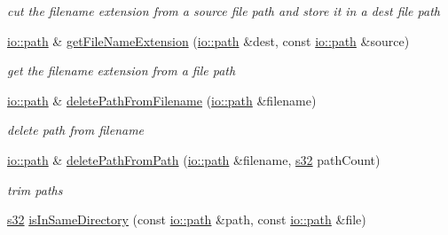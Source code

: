 \begin{DoxyCompactItemize}
\begin{DoxyCompactList}\small\item\em cut the filename extension from a source file path and store it in a dest file path \end{DoxyCompactList}\item 
\mbox{\label{namespaceirr_1_1core_abebbe8b229dc865ebeb9bb0fd367d6ea}} 
\hyperlink{namespaceirr_1_1io_ab1bdc45edb3f94d8319c02bc0f840ee1}{io\+::path} \& \hyperlink{namespaceirr_1_1core_abebbe8b229dc865ebeb9bb0fd367d6ea}{get\+File\+Name\+Extension} (\hyperlink{namespaceirr_1_1io_ab1bdc45edb3f94d8319c02bc0f840ee1}{io\+::path} \&dest, const \hyperlink{namespaceirr_1_1io_ab1bdc45edb3f94d8319c02bc0f840ee1}{io\+::path} \&source)
\begin{DoxyCompactList}\small\item\em get the filename extension from a file path \end{DoxyCompactList}\item 
\mbox{\label{namespaceirr_1_1core_a905c95bab4a7e8d5360a19b0726383a9}} 
\hyperlink{namespaceirr_1_1io_ab1bdc45edb3f94d8319c02bc0f840ee1}{io\+::path} \& \hyperlink{namespaceirr_1_1core_a905c95bab4a7e8d5360a19b0726383a9}{delete\+Path\+From\+Filename} (\hyperlink{namespaceirr_1_1io_ab1bdc45edb3f94d8319c02bc0f840ee1}{io\+::path} \&filename)
\begin{DoxyCompactList}\small\item\em delete path from filename \end{DoxyCompactList}\item 
\mbox{\label{namespaceirr_1_1core_a9215d20e34c12cb6c1522366389bfcce}} 
\hyperlink{namespaceirr_1_1io_ab1bdc45edb3f94d8319c02bc0f840ee1}{io\+::path} \& \hyperlink{namespaceirr_1_1core_a9215d20e34c12cb6c1522366389bfcce}{delete\+Path\+From\+Path} (\hyperlink{namespaceirr_1_1io_ab1bdc45edb3f94d8319c02bc0f840ee1}{io\+::path} \&filename, \hyperlink{namespaceirr_ac66849b7a6ed16e30ebede579f9b47c6}{s32} path\+Count)
\begin{DoxyCompactList}\small\item\em trim paths \end{DoxyCompactList}\item 
\mbox{\label{namespaceirr_1_1core_afc9926e02ab9727cd5998ab2ffa9fa32}} 
\hyperlink{namespaceirr_ac66849b7a6ed16e30ebede579f9b47c6}{s32} \hyperlink{namespaceirr_1_1core_afc9926e02ab9727cd5998ab2ffa9fa32}{is\+In\+Same\+Directory} (const \hyperlink{namespaceirr_1_1io_ab1bdc45edb3f94d8319c02bc0f840ee1}{io\+::path} \&path, const \hyperlink{namespaceirr_1_1io_ab1bdc45edb3f94d8319c02bc0f840ee1}{io\+::path} \&file)

\end{DoxyCompactItemize}
